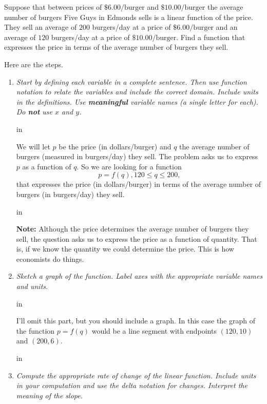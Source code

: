 \documentclass{ximera}
\newcommand{\pskip}{\vskip 0.1 in}
\begin{document}
\begin{example}  \label{Ex5:LF}
Suppose that between prices of $\$6.00/\text{burger}$ and $\$10.00/\text{burger}$ the average number of burgers Five Guys in Edmonds sells is a linear function of the price. They sell an average of $200$ burgers/day at a price of $\$6.00/\text{burger}$ and an average of $120$ burgers/day at a price of $\$10.00/\text{burger}$. Find a function that expresses the price in terms of the average number of burgers they sell.

\begin{explanation}
Here are the steps.

\begin{enumerate}
\item \emph{Start by defining each variable in a complete sentence. Then use function notation to relate the variables and include the correct domain. Include units in the definitions. Use {\bf meaningful} variable names (a single letter for each). Do {\bf not} use $x$ and $y$.}

\pskip

We will let $p$ be the price (in dollars/burger) and $q$ the average number of burgers (measured in burgers/day) they sell. The problem asks us to express $p$ as a function of $q$. So we are looking for a function
\[
   p = f(q) , 120 \leq q \leq 200 ,
\]
that expresses the price (in dollars/burger) in terms of the average number of burgers (in burgers/day) they sell.

\pskip

{\bf Note:} Although the price determines the average number of burgers they sell, the question asks us to express the price as a function of quantity. That is, if we know the quantity we could determine the price. This is how economists do things.


\item \emph{Sketch a graph of the function. Label axes with the appropriate variable names and units.}

\pskip 

I'll omit this part, but you should include a graph. In this case the graph of the function $p=f(q)$ would be a line  segment with endpoints $(120, 10)$ and $(200, 6)$.

\pskip

\item \emph{Compute the appropriate rate of change of the linear function. Include units in your computation and use the delta notation for changes. Interpret the meaning of the slope.}


\end{enumerate}
\end{explanation}
\end{example}
\end{document}
